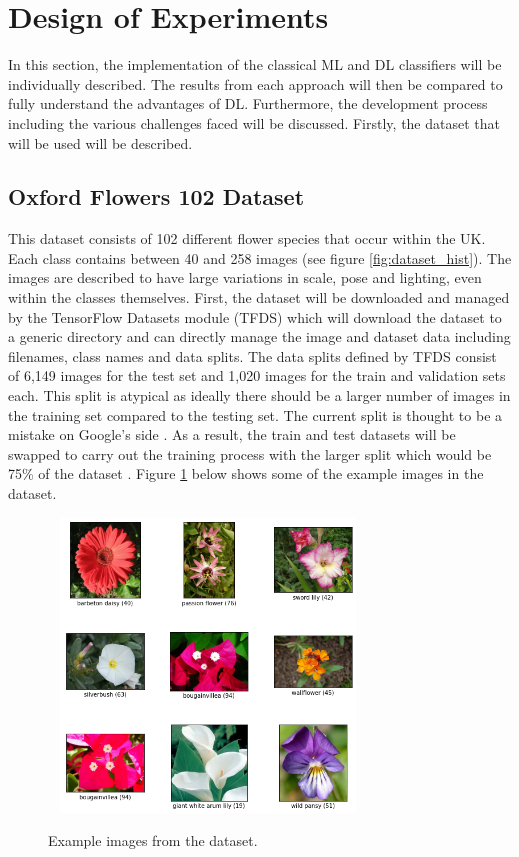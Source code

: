 \documentclass[12pt,a4paper]{report}
\begin{document}
\section{Design of Experiments}

In this section, the implementation of the classical ML and DL classifiers will be individually described. The results 
from each
approach will then be compared to fully understand the advantages of DL. Furthermore, the development process
including the various challenges faced will be discussed. Firstly, the dataset that will be used will be described.

\subsection{Oxford Flowers 102 Dataset}

This dataset consists of 102 different flower species that occur within the UK. Each class contains between 40 and 258 
images (see figure \ref{fig:dataset_hist}). The images are described to have large variations in scale, 
pose and lighting, even within the classes
themselves. First, the dataset will be downloaded and managed by the TensorFlow Datasets module (TFDS) which will download 
the dataset to a generic directory and can directly manage the image and dataset data including filenames, class names 
and data splits. The data splits defined by TFDS consist of 6,149 images for the test set and 1,020 images for the 
train and validation sets each. This split is atypical as ideally there should be a larger number of images in the training 
set compared to the testing set. The current split is thought to be a mistake on Google's side \citep{githubissue}. As a 
result, the train and test datasets will be swapped to carry out the training process with the larger split which would be 
75\% of the dataset \citep{TFOX102}. Figure \ref{fig:ox102} below shows some of the example images in the dataset.

\begin{figure}[h]\
    \centering
    \includegraphics[width=0.7\textwidth]{ox102examples.png}
    \caption{Example images from the dataset.}
    \label{fig:ox102}
\end{figure}
\end{document}
